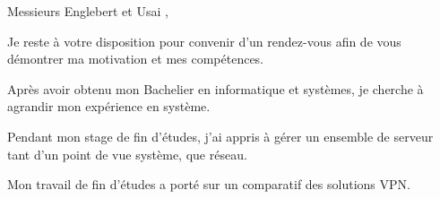 \documentclass[11pt,a4paper]{moderncv}
\begin{document}
\clearpage

\date{\today} %
\opening{Messieurs Englebert et Usai ,} %
\closing{Je reste à votre disposition pour convenir d'un rendez-vous afin de vous démontrer ma motivation et mes compétences.} %

\makelettertitle %

Après avoir obtenu mon Bachelier en informatique et systèmes, je cherche à agrandir mon expérience en système. 

Pendant mon stage de fin d'études, j'ai appris à gérer un ensemble de serveur tant d'un point de vue système, que réseau.  

Mon travail de fin d'études a porté sur un comparatif des solutions VPN. 

\makeletterclosing %
\end{document}
